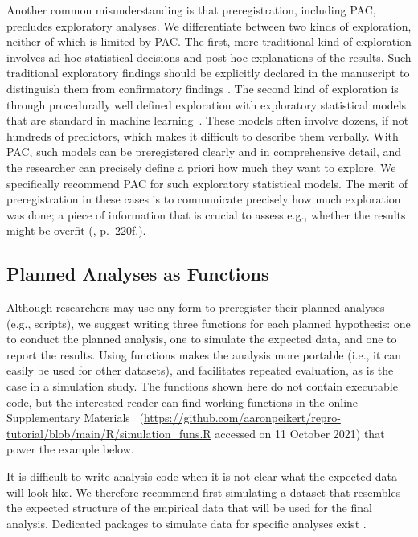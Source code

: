 \documentclass[psych,tutorial,accept,moreauthors,pdftex]{Definitions/mdpi}
\begin{document}
\begin{paracol}{2}
Another common misunderstanding is that preregistration, including PAC,
precludes exploratory analyses. We differentiate between two kinds of
exploration, neither of which is limited by PAC. The first, more
traditional kind of exploration involves ad hoc statistical decisions
and post hoc explanations of the results. Such traditional exploratory
findings should be explicitly declared in the manuscript to distinguish
them from confirmatory findings
\citep{NosekRevolution2018, nosekPreregistrationHardWorthwhile2019}. The
second kind of exploration is through procedurally well defined
exploration with exploratory statistical models that are standard in
machine learning~\citep{brandmaier22mlsem}. These models often involve
dozens, if not hundreds of predictors, which makes it difficult to
describe them verbally. With PAC, such models can be preregistered
clearly and in comprehensive detail, and the researcher can precisely define
a priori how much they want to explore. We specifically recommend PAC
for such exploratory statistical models. The merit of preregistration in
these cases is to communicate precisely how much exploration was done; a
piece of information that is crucial to assess e.g., whether the results
might be overfit
(\citep{hastieElementsStatisticalLearning2017}, p.~220f.).

\subsection{Planned Analyses as
Functions}\label{planned-analyses-as-functions}

Although researchers may use any form to preregister their planned
analyses (e.g., scripts), we suggest writing three functions for each
planned hypothesis: one to conduct the planned analysis, one to simulate
the expected data, and one to report the results. Using functions makes the
analysis more portable (i.e., it can easily be used for other datasets),
and facilitates repeated evaluation, as is the case in a simulation
study. The functions shown here do not contain executable code, but the
interested reader can find working functions in the {online
Supplementary Materials}
~(\url{https://github.com/aaronpeikert/repro-tutorial/blob/main/R/simulation_funs.R} accessed on 11 October 2021) that power the example below.

It is difficult to write analysis code when it is not clear what the
expected data will look like. We therefore recommend first simulating a
dataset that resembles the expected structure of the empirical data that
will be used for the final analysis. Dedicated packages to simulate data
for specific analyses exist .


\end{paracol}
\end{document}
